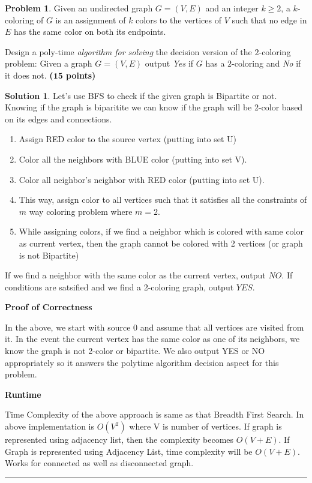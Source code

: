 \documentclass{article}
\theoremstyle{definition}
\newtheorem{problem}{Problem}
\def\fline{\rule{0.75\linewidth}{0.5pt}}
\newcommand{\finishline}{\begin{center}\fline\end{center}}
\newtheorem*{solution*}{Solution}
\newenvironment{solution}{\begin{solution*}}{{\finishline} \end{solution*}}
\newcommand{\grade}[1]{\hfill{\textbf{($\mathbf{#1}$ points)}}}
\begin{document}
\begin{problem}\label{prob}
 	Given an undirected graph $G=(V,E)$ and an integer $k \geq 2$, a $k$-coloring of $G$ is an assignment of $k$ colors to the vertices of $V$ such that no edge in $E$ has the same color on both its endpoints. 
	
	
	\begin{itemize}
		\item[(a)] Design a poly-time \emph{algorithm for solving} the decision version of the $2$-coloring problem: Given a graph $G=(V,E)$ output \emph{Yes} if $G$ has a $2$-coloring and \emph{No} if it does not. \grade{15}
		
\begin{solution}
	\item Let's use BFS to check if the given graph is Bipartite or not. Knowing if the graph is biparitite we can know if the graph will be 2-color based on its edges and connections. 
	\item\begin{enumerate}
		\item Assign RED color to the source vertex (putting into set U)
		\item Color all the neighbors with BLUE color (putting into set V). 
		\item Color all neighbor’s neighbor with RED color (putting into set U). 
		\item This way, assign color to all vertices such that it satisfies all the constraints of $m$ way coloring problem where $m = 2$. 
		\item While assigning colors, if we find a neighbor which is colored with same color as current vertex, then the graph cannot be colored with 2 vertices (or graph is not Bipartite) 
	\end{enumerate}
	\item If we find a neighbor with the same color as the current vertex, output $NO$. If conditions are satsified and we find  a 2-coloring graph, output $YES$.

\item\textbf{Proof of Correctness}
	\item In the above, we start with source 0 and assume that all vertices are visited from it. In the event the current vertex has the same color as one of its neighbors, we know the graph is not 2-color or bipartite. We also output YES or NO appropriately so it answers the polytime algorithm decision aspect for this problem.

\item\textbf{Runtime}
	\item Time Complexity of the above approach is same as that Breadth First Search. In above implementation is $O(V^2)$ where V is number of vertices. If graph is represented using adjacency list, then the complexity becomes $O(V+E)$. If Graph is represented using Adjacency List, time complexity will be $O(V+E)$. Works for connected as well as disconnected graph.


\end{solution}
\end{itemize}
\end{problem}
\end{document}
